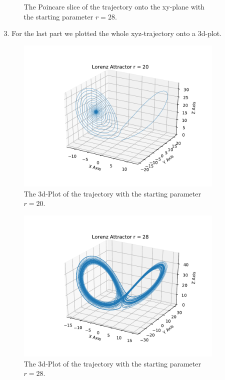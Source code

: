 \begin{itemize}
\begin{itemize}
\begin{figure}
                        \caption{The Poincare slice of the trajectory onto the xy-plane with the starting parameter $r=28$.}
                    \end{figure}
                    \FloatBarrier
                \item[3.]
                    For the last part we plotted the whole xyz-trajectory onto a 3d-plot.
                    \FloatBarrier
                    \begin{figure}
                        \includegraphics[width=\textwidth]{images/Lorentz_r_20_3d.pdf}
                        \caption{The 3d-Plot of the trajectory with the starting parameter $r=20$.}
                    \end{figure}
                    \begin{figure}
                        \includegraphics[width=\textwidth]{images/Lorentz_r_28_3d.pdf}
                        \caption{The 3d-Plot of the trajectory with the starting parameter $r=28$.}
                    \end{figure}
            \end{itemize}
\end{itemize}              